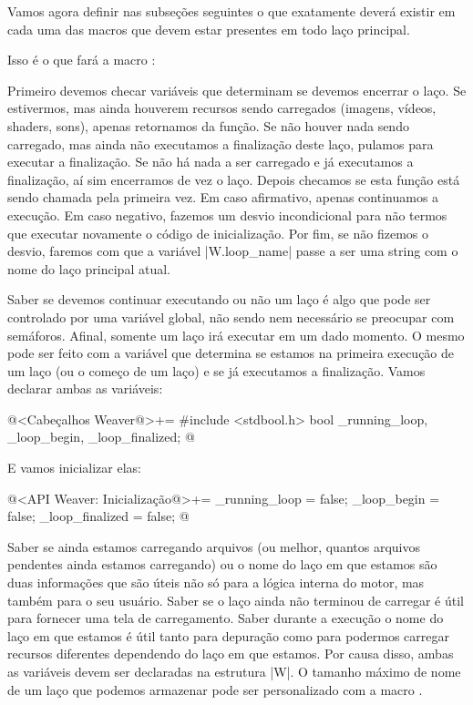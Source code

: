 Vamos agora definir nas subseções seguintes o que exatamente deverá
existir em cada uma das macros que devem estar presentes em todo laço
principal.


Isso é o que fará a macro :

Primeiro devemos checar variáveis que determinam se devemos encerrar o
laço. Se estivermos, mas ainda houverem recursos sendo carregados
(imagens, vídeos, shaders, sons), apenas retornamos da função. Se não
houver nada sendo carregado, mas ainda não executamos a finalização
deste laço, pulamos para executar a finalização. Se não há nada a ser
carregado e já executamos a finalização, aí sim encerramos de vez o
laço. Depois checamos se esta função está sendo chamada pela primeira
vez. Em caso afirmativo, apenas continuamos a execução. Em caso
negativo, fazemos um desvio incondicional para não termos que executar
novamente o código de inicialização. Por fim, se não fizemos o desvio,
faremos com que a variável |W.loop_name| passe a ser uma string com o
nome do laço principal atual.

Saber se devemos continuar executando ou não um laço é algo que pode
ser controlado por uma variável global, não sendo nem necessário se
preocupar com semáforos. Afinal, somente um laço irá executar em um
dado momento. O mesmo pode ser feito com a variável que determina se
estamos na primeira execução de um laço (ou o começo de um laço) e se
já executamos a finalização. Vamos declarar ambas as variáveis:

\iniciocodigo
@<Cabeçalhos Weaver@>+=
#include <stdbool.h>
bool _running_loop, _loop_begin, _loop_finalized;
@
\fimcodigo

E vamos inicializar elas:

\iniciocodigo
@<API Weaver: Inicialização@>+=
_running_loop = false;
_loop_begin = false;
_loop_finalized = false;
@
\fimcodigo

Saber se ainda estamos carregando arquivos (ou melhor, quantos
arquivos pendentes ainda estamos carregando) ou o nome do laço em que
estamos são duas informações que são úteis não só para a lógica
interna do motor, mas também para o seu usuário. Saber se o laço ainda
não terminou de carregar é útil para fornecer uma tela de
carregamento. Saber durante a execução o nome do laço em que estamos é
útil tanto para depuração como para podermos carregar recursos
diferentes dependendo do laço em que estamos. Por causa disso, ambas
as variáveis devem ser declaradas na estrutura |W|. O tamanho máximo
de nome de um laço que podemos armazenar pode ser personalizado com a
macro .

